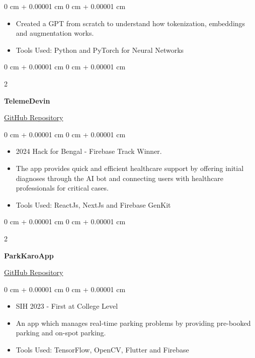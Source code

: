 \documentclass[10pt, letterpaper]{article}
\newenvironment{highlights}{
    \begin{itemize}[
        topsep=0.10 cm,
        parsep=0.10 cm,
        partopsep=0pt,
        itemsep=0pt,
        leftmargin=0 cm + 10pt
    ]
}{
    \end{itemize}
} %
\newenvironment{onecolentry}{
    \begin{adjustwidth}{
        0 cm + 0.00001 cm
    }{
        0 cm + 0.00001 cm
    }
}{
    \end{adjustwidth}
} %
\newenvironment{twocolentry}[2][]{
    \onecolentry
    \def\secondColumn{#2}
    \setcolumnwidth{\fill, 4.5 cm}
    \begin{paracol}{2}
}{
    \switchcolumn \raggedleft \secondColumn
    \end{paracol}
    \endonecolentry
} %
\begin{document}
\begin{onecolentry}
    \begin{highlights}
        \item Created a GPT from scratch to understand how tokenization, embeddings and augmentation works.
        \item Tools Used: Python and PyTorch for Neural Networks
    \end{highlights}
\end{onecolentry}

\vspace{0.2 cm}

\begin{twocolentry}{
    \href{https://github.com/debarshee2004/telemedevin}{GitHub Repository}
}
    \textbf{TelemeDevin}
\end{twocolentry}

\vspace{0.10 cm}

\begin{onecolentry}
    \begin{highlights}
        \item 2024 Hack for Bengal - Firebase Track Winner.
        \item The app provides quick and efficient healthcare support by offering initial diagnoses through the AI bot and connecting users with healthcare professionals for critical cases.
        \item Tools Used: ReactJs, NextJs and Firebase GenKit
    \end{highlights}
\end{onecolentry}
\vspace{0.2 cm}

\begin{twocolentry}{
    \href{https://github.com/debarshee2004/parkkaroapp}{GitHub Repository}
}
    \textbf{ParkKaroApp}
\end{twocolentry}

\vspace{0.10 cm}

\begin{onecolentry}
    \begin{highlights}
        \item SIH 2023 - First at College Level
        \item An app which manages real-time parking problems by providing pre-booked parking and on-spot parking.
        \item Tools Used: TensorFlow, OpenCV, Flutter and Firebase
    \end{highlights}
\end{onecolentry}
\end{document}
